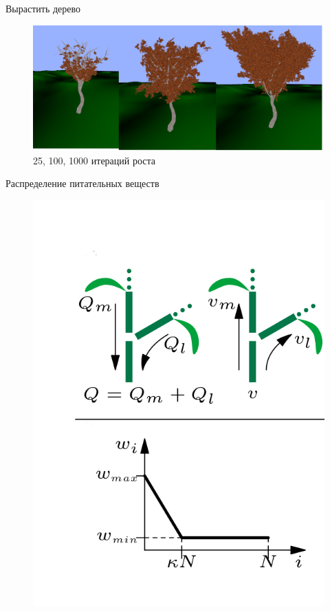\documentclass[11pt]{beamer}
\begin{document}
\begin{frame}{Вырастить дерево}
\begin{figure}[hbtp]
\includegraphics[scale=0.2]{iterations.png}
\caption{25, 100, 1000 итераций роста}
\end{figure}
\end{frame}
\begin{frame}{Распределение питательных веществ}
\begin{figure}[hbtp]
\includegraphics[scale=0.3]{weights.png}
\end{figure}
\end{frame}
\end{document}
